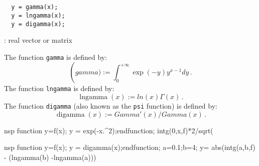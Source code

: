 \begin{mandesc}
  \\
  \\
\end{mandesc}
\begin{calling_sequence}
\begin{verbatim}
  y = gamma(x);
  y = lngamma(x);  
  y = digamma(x);  
\end{verbatim}
\end{calling_sequence}
\begin{parameters}
  \begin{varlist}
    : real vector or matrix
  \end{varlist}
\end{parameters}

\begin{mandescription}
  The function \verb+gamma+ is defined by: 
  \[
  \operatorname(gamma) := \int_0^{+\infty} \exp(-y)y^{x-1} dy \,.
  \]
  The function \verb+lngamma+ is defined by:
  \[
  \operatorname{lngamma}(x) := ln(x)\Gamma(x) \,.
  \]
  The function \verb+digamma+ (also known as the \verb+psi+ function) 
  is defined by:
  \[
  \operatorname{digamma}(x) := Gamma'(x)/Gamma(x)\,.
  \]  
\end{mandescription}
\begin{examples}
\begin{mintednsp}{nsp}
  function y=f(x); y = exp(-x.^2);endfunction;
  intg(0,x,f)*2/sqrt(%
\end{mintednsp}

\begin{mintednsp}{nsp}
function y=f(x); y = digamma(x);endfunction;
a=0.1;b=4;
y= abs(intg(a,b,f) - (lngamma(b) -lngamma(a)))
\end{mintednsp}

\end{examples}

